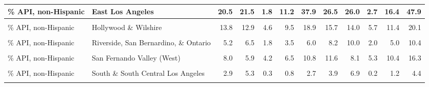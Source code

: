 \begin{table}[!h]
\begin{tabular}[t]{l|>{}l||r|r|r|r|r|r|r|r|r|r}
\hline
\% API, non-Hispanic & East Los Angeles & 20.5 & 21.5 & 1.8 & 11.2 & 37.9 & 26.5 & 26.0 & 2.7 & 16.4 & 47.9\\
\hline
\cellcolor{gray!6}{\% API, non-Hispanic} & \cellcolor{gray!6}{Glendale and Pasadena} & \cellcolor{gray!6}{17.4} & \cellcolor{gray!6}{15.5} & \cellcolor{gray!6}{6.2} & \cellcolor{gray!6}{11.6} & \cellcolor{gray!6}{23.1} & \cellcolor{gray!6}{20.9} & \cellcolor{gray!6}{19.8} & \cellcolor{gray!6}{7.1} & \cellcolor{gray!6}{13.0} & \cellcolor{gray!6}{27.3}\\
\hline
\% API, non-Hispanic & Hollywood \& Wilshire & 13.8 & 12.9 & 4.6 & 9.5 & 18.9 & 15.7 & 14.0 & 5.7 & 11.4 & 20.1\\
\hline
\cellcolor{gray!6}{\% API, non-Hispanic} & \cellcolor{gray!6}{Long Beach} & \cellcolor{gray!6}{11.4} & \cellcolor{gray!6}{10.1} & \cellcolor{gray!6}{4.7} & \cellcolor{gray!6}{8.1} & \cellcolor{gray!6}{15.3} & \cellcolor{gray!6}{13.2} & \cellcolor{gray!6}{11.3} & \cellcolor{gray!6}{4.9} & \cellcolor{gray!6}{10.2} & \cellcolor{gray!6}{18.2}\\
\hline
\% API, non-Hispanic & Riverside, San Bernardino, \& Ontario & 5.2 & 6.5 & 1.8 & 3.5 & 6.0 & 8.2 & 10.0 & 2.0 & 5.0 & 10.4\\
\hline
\cellcolor{gray!6}{\% API, non-Hispanic} & \cellcolor{gray!6}{San Fernando Valley (East)} & \cellcolor{gray!6}{7.2} & \cellcolor{gray!6}{4.9} & \cellcolor{gray!6}{4.6} & \cellcolor{gray!6}{5.7} & \cellcolor{gray!6}{7.7} & \cellcolor{gray!6}{8.3} & \cellcolor{gray!6}{5.4} & \cellcolor{gray!6}{4.7} & \cellcolor{gray!6}{6.9} & \cellcolor{gray!6}{10.2}\\
\hline
\% API, non-Hispanic & San Fernando Valley (West) & 8.0 & 5.9 & 4.2 & 6.5 & 10.8 & 11.6 & 8.1 & 5.3 & 10.4 & 16.3\\
\hline
\cellcolor{gray!6}{\% API, non-Hispanic} & \cellcolor{gray!6}{Santa Ana} & \cellcolor{gray!6}{14.1} & \cellcolor{gray!6}{13.6} & \cellcolor{gray!6}{4.5} & \cellcolor{gray!6}{9.2} & \cellcolor{gray!6}{18.1} & \cellcolor{gray!6}{20.1} & \cellcolor{gray!6}{18.3} & \cellcolor{gray!6}{6.5} & \cellcolor{gray!6}{14.3} & \cellcolor{gray!6}{26.5}\\
\hline
\% API, non-Hispanic & South \& South Central Los Angeles & 2.9 & 5.3 & 0.3 & 0.8 & 2.7 & 3.9 & 6.9 & 0.2 & 1.2 & 4.4\\
\hline
\cellcolor{gray!6}{\% API, non-Hispanic} & \cellcolor{gray!6}{South Bay} & \cellcolor{gray!6}{16.6} & \cellcolor{gray!6}{13.7} & \cellcolor{gray!6}{6.1} & \cellcolor{gray!6}{11.0} & \cellcolor{gray!6}{26.8} & \cellcolor{gray!6}{21.2} & \cellcolor{gray!6}{15.9} & \cellcolor{gray!6}{8.2} & \cellcolor{gray!6}{17.8} & \cellcolor{gray!6}{30.3}\\

\end{tabular}
\end{table}
